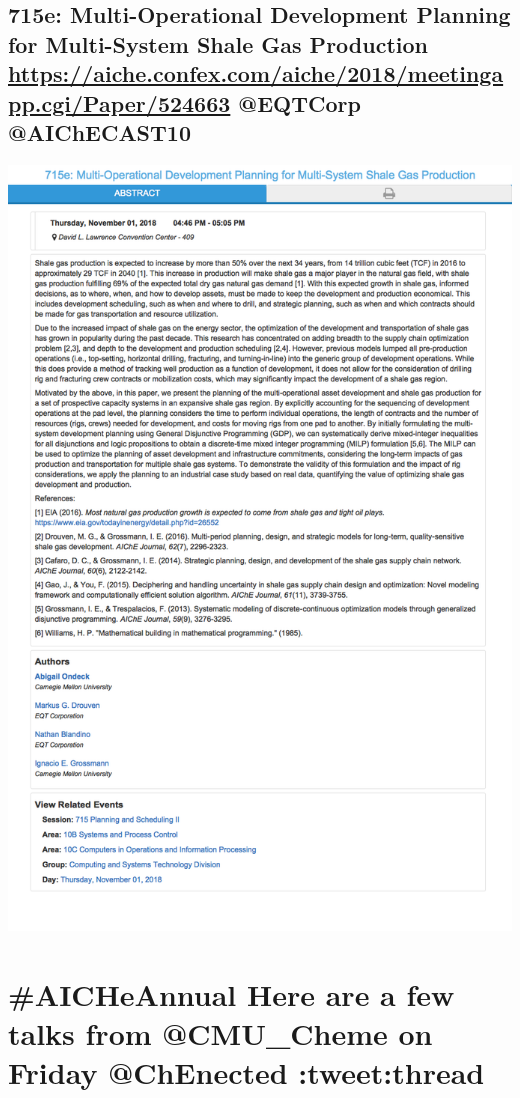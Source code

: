\documentclass[11pt]{article}
\begin{document}
\subsection{715e: Multi-Operational Development Planning for Multi-System Shale Gas Production \url{https://aiche.confex.com/aiche/2018/meetingapp.cgi/Paper/524663} @EQTCorp @AIChECAST10}
\label{sec:org66230fd}
\begin{center}
\includegraphics[width=.9\linewidth]{./524663.png}
\end{center}






\section{\#AICHeAnnual Here are a few talks from @CMU\_Cheme on Friday @ChEnected :tweet:thread}
\label{sec:org03a6f66}
\end{document}
